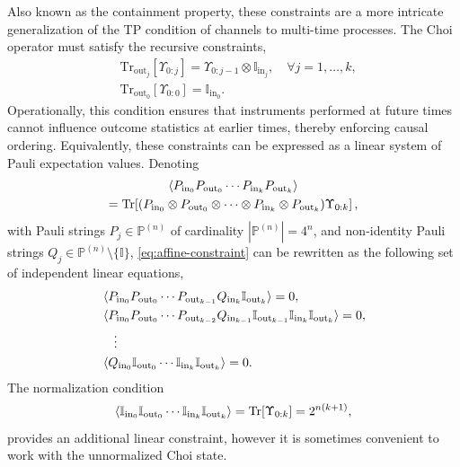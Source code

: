 \documentclass[
    aps,
    prx,
    reprint,
    superscriptaddress,
    longbibliography,
    nofootinbib,
    floatfix,
]{revtex4-2}
\newcommand{\Tr}{\mathrm{Tr}}
\begin{document}
\begin{enumerate}
    Also known as the containment property, these constraints are a more intricate generalization of the TP condition of channels to multi-time processes. The Choi operator must satisfy the recursive constraints,
    \begin{equation}\label{eq:affine-constraint}
        \begin{split}
            &\Tr_{\mathrm{out}_j}[\Upsilon_{0:j}] = \Upsilon_{0:j-1} \otimes \mathbb{I}_{\mathrm{in}_j}, \quad \forall j=1,\dots,k, \\
            &\Tr_{\mathrm{out}_0}[\Upsilon_{0:0}] = \mathbb{I}_{\mathrm{in}_0}.
        \end{split}
    \end{equation}
    Operationally, this condition ensures that instruments performed at future times cannot influence outcome statistics at earlier times, thereby enforcing causal ordering. Equivalently, these constraints can be expressed as a linear system of Pauli expectation values. Denoting
    \begin{multline}
        \braket{P_{\mathrm{in}_0}P_{\mathrm{out}_0}\cdots P_{\mathrm{in}_k}P_{\mathrm{out}_k}} \\
        = \Tr\!\left[(P_{\mathrm{in}_0}\otimes P_{\mathrm{out}_0} \otimes\cdots\otimes P_{\mathrm{in}_k}\otimes P_{\mathrm{out}_k})\Upsilon_{0:k}\right],
    \end{multline}
with Pauli strings \(P_j \in \mathbb{P}^{(n)}\) of cardinality \(|\mathbb{P}^{(n)}| = 4^n\), and non-identity Pauli strings \(Q_j \in \mathbb{P}^{(n)} \setminus \{\mathbb{I}\}\), \cref{eq:affine-constraint} can be rewritten as the following set of independent linear equations,
    \begin{equation}
        \begin{split}
            &\braket{P_{\mathrm{in}_0}P_{\mathrm{out}_0}\cdots P_{\mathrm{out}_{k-1}}Q_{\mathrm{in}_k}\mathbb{I}_{\mathrm{out}_k}} = 0, \\
            &\braket{P_{\mathrm{in}_0}P_{\mathrm{out}_0}\cdots P_{\mathrm{out}_{k-2}}Q_{\mathrm{in}_{k-1}}\mathbb{I}_{\mathrm{out}_{k-1}}\mathbb{I}_{\mathrm{in}_k}\mathbb{I}_{\mathrm{out}_k}} = 0, \\
            &\quad\vdots \\
            &\braket{Q_{\mathrm{in}_0}\mathbb{I}_{\mathrm{out}_0}\cdots \mathbb{I}_{\mathrm{in}_k}\mathbb{I}_{\mathrm{out}_k}} = 0.
        \end{split}
    \end{equation}
    The normalization condition 
    \begin{equation}
        \braket{\mathbb{I}_{\mathrm{in}_0}\mathbb{I}_{\mathrm{out}_0}\cdots \mathbb{I}_{\mathrm{in}_k}\mathbb{I}_{\mathrm{out}_k}} = \Tr{[\Upsilon_{0:k}]} = 2^{n(k+1)},
    \end{equation}
    provides an additional linear constraint, however it is sometimes convenient to work with the unnormalized Choi state. 
\end{enumerate}
\end{document}
